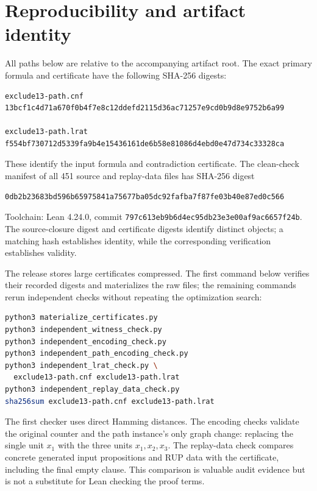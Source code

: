 \documentclass[11pt]{article}
\begin{document}
\section{Reproducibility and artifact identity}\label{sec:reproduce}
All paths below are relative to the accompanying artifact root. The exact primary formula and certificate have the following SHA-256 digests:
\begin{lstlisting}
exclude13-path.cnf
13bcf1c4d71a670f0b4f7e8c12ddefd2115d36ac71257e9cd0b9d8e9752b6a99

exclude13-path.lrat
f554bf730712d5339fa9b4e15436161de6b58e81086d4ebd0e47d734c33328ca
\end{lstlisting}
These identify the input formula and contradiction certificate. The clean-check manifest of all 451 source and replay-data files has SHA-256 digest
\begin{lstlisting}
0db2b23683bd596b65975841a75677ba05dc92fafba7f87fe03b40e87ed0c566
\end{lstlisting}
Toolchain: Lean 4.24.0, commit \texttt{797c613eb9b6d4ec95db23e3e00af9ac6657f24b}.
The source-closure digest and certificate digests identify distinct objects; a matching hash establishes identity, while the corresponding verification establishes validity.

The release stores large certificates compressed. The first command below verifies their recorded digests and materializes the raw files; the remaining commands rerun independent checks without repeating the optimization search:
\begin{lstlisting}[language=bash]
python3 materialize_certificates.py
python3 independent_witness_check.py
python3 independent_encoding_check.py
python3 independent_path_encoding_check.py
python3 independent_lrat_check.py \
  exclude13-path.cnf exclude13-path.lrat
python3 independent_replay_data_check.py
sha256sum exclude13-path.cnf exclude13-path.lrat
\end{lstlisting}
The first checker uses direct Hamming distances. The encoding checks validate the original counter and the path instance's only graph change: replacing the single unit $x_1$ with the three units $x_1,x_2,x_3$. The replay-data check compares concrete generated input propositions and RUP data with the certificate, including the final empty clause. This comparison is valuable audit evidence but is not a substitute for Lean checking the proof terms.
\end{document}
